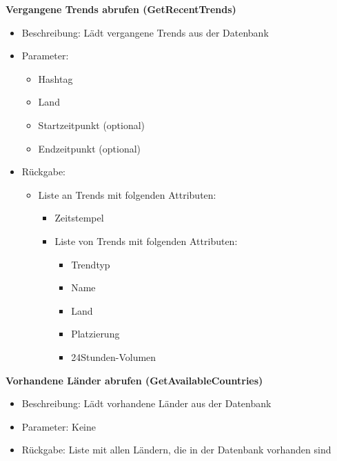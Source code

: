 \documentclass[conference]{IEEEtran}
\begin{document}
\smallskip
\textbf{Vergangene Trends abrufen (GetRecentTrends)}
\begin{itemize}
    \item Beschreibung: Lädt vergangene Trends aus der Datenbank
    \item Parameter:
          \begin{itemize}
              \item Hashtag
              \item Land
              \item Startzeitpunkt (optional)
              \item Endzeitpunkt (optional)
          \end{itemize}
    \item Rückgabe:
          \begin{itemize}
              \item Liste an Trends mit folgenden Attributen:
                    \begin{itemize}
                        \item Zeitstempel
                        \item Liste von Trends mit folgenden Attributen:
                              \begin{itemize}
                                  \item Trendtyp
                                  \item Name
                                  \item Land
                                  \item Platzierung
                                  \item 24Stunden-Volumen
                              \end{itemize}
                    \end{itemize}
          \end{itemize}
\end{itemize}

\smallskip
\textbf{Vorhandene Länder abrufen (GetAvailableCountries)}
\begin{itemize}
    \item Beschreibung: Lädt vorhandene Länder aus der Datenbank
    \item Parameter: Keine
    \item Rückgabe: Liste mit allen Ländern, die in der Datenbank vorhanden sind
\end{itemize}

\smallskip
\end{document}
